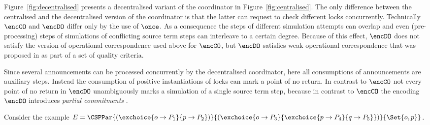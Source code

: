 \documentclass[copyright,creativecommons]{eptcs}
\begin{document}
Figure~\ref{fig:decentralised} presents a decentralised variant of the coordinator in Figure~\ref{fig:centralised}.
The only difference between the centralised and the decentralised version of the coordinator is that the latter can request to check different locks concurrently. Technically $ \encCO $ and $ \encDO $ differ only by the use of $ \once $. As a consequence the steps of different simulation attempts can overlap and even (pre-processing) steps of simulations of conflicting source term steps can interleave to a certain degree. Because of this effect, $ \encDO $ does not satisfy the version of operational correspondence used above for $ \encCO $, but $ \encDO $ satisfies weak operational correspondence that was proposed in \cite{gorla10} as part of a set of quality criteria.

Since several announcements can be processed concurrently by the decentralised coordinator, here all consumptions of announcements are auxiliary steps. Instead the consumption of positive instantiations of locks can mark a point of no return. In contrast to $ \encCO $ not every point of no return in $ \encDO $ unambiguously marks a simulation of a single source term step, because in contrast to $ \encCO $ the encoding $ \encDO $ introduces \emph{partial commitments} \cite{peters12,petersNestmann12}.

Consider the example $ E = \CSPPar{\left( \exchoice{o \to P_1}{p \to P_2} \right)}{\left( \exchoice{o \to P_3}{\exchoice{p \to P_4}{q \to P_5}} \right)}{\Set{ o, p }} $.
\end{document}
